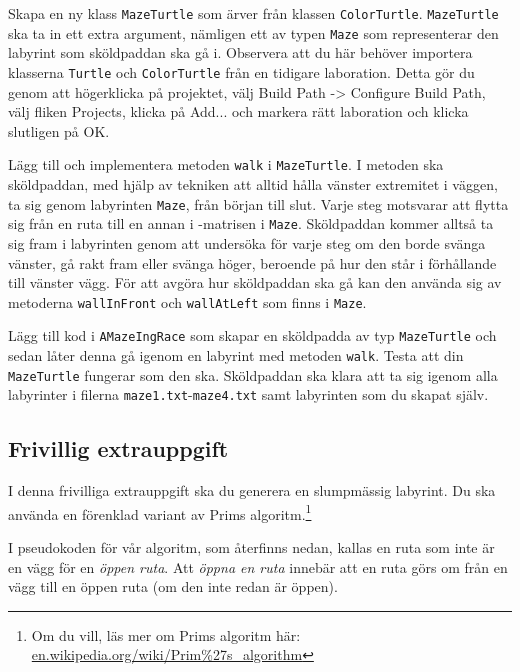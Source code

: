 \Subtask Skapa en ny klass \texttt{MazeTurtle} som ärver från klassen \texttt{ColorTurtle}. \texttt{MazeTurtle} ska ta in ett extra argument, nämligen ett av typen \texttt{Maze} som representerar den labyrint som sköldpaddan ska gå i. Observera att du här behöver importera klasserna \texttt{Turtle} och \texttt{ColorTurtle} från en tidigare laboration. Detta gör du genom att högerklicka på projektet, välj Build Path -> Configure Build Path, välj fliken Projects, klicka på Add... och markera rätt laboration och klicka slutligen på OK.

\Subtask Lägg till och implementera metoden \texttt{walk} i \texttt{MazeTurtle}. I metoden ska sköldpaddan, med hjälp av tekniken att alltid hålla vänster extremitet i väggen, ta sig genom labyrinten \texttt{Maze}, från början till slut. Varje steg motsvarar att flytta sig från en ruta till en annan i -matrisen i \texttt{Maze}. Sköldpaddan kommer alltså ta sig fram i labyrinten genom att undersöka för varje steg om den borde svänga vänster, gå rakt fram eller svänga höger, beroende på hur den står i förhållande till vänster vägg. För att avgöra hur sköldpaddan ska gå kan den använda sig av metoderna \texttt{wallInFront} och \texttt{wallAtLeft} som finns i \texttt{Maze}.

\Subtask Lägg till kod i \texttt{AMazeIngRace} som skapar en sköldpadda av typ \texttt{MazeTurtle} och sedan låter denna gå igenom en labyrint med metoden \texttt{walk}. Testa att din \texttt{MazeTurtle} fungerar som den ska. Sköldpaddan ska klara att ta sig igenom alla labyrinter i filerna \texttt{maze1.txt}-\texttt{maze4.txt} samt labyrinten som du skapat själv.

\newpage

\subsection{Frivillig extrauppgift}

I denna frivilliga extrauppgift ska du generera en slumpmässig labyrint. Du ska använda en förenklad variant av Prims algoritm.\footnote{Om du vill, läs mer om Prims algoritm här: \href{https://en.wikipedia.org/wiki/Prim\%27s_algorithm}{en.wikipedia.org/wiki/Prim\%27s\_algorithm}}

I pseudokoden för vår algoritm, som återfinns nedan, kallas en ruta som inte är en vägg för en \emph{öppen ruta}. Att \emph{öppna en ruta} innebär att en ruta görs om från en vägg till en öppen ruta (om den inte redan är öppen). 
 
